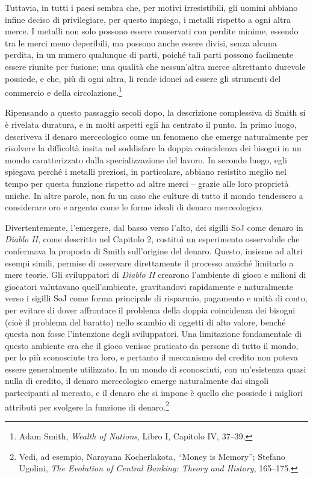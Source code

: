 \documentclass[
  a5paper,
  smalldemyvopaper,10pt,twoside,onecolumn,openright,extrafontsizes,hidelinks]{memoir}
\renewenvironment{quote}%
               {\list{}{\rightmargin=.6cm\leftmargin=.6cm}%
                \itshape \item[]}%
               {\endlist}
\begin{document}
\begin{quote}
Tuttavia, in tutti i paesi sembra che, per motivi irresistibili, gli
uomini abbiano infine deciso di privilegiare, per questo impiego, i
metalli rispetto a ogni altra merce. I metalli non solo possono essere
conservati con perdite minime, essendo tra le merci meno deperibili, ma
possono anche essere divisi, senza alcuna perdita, in un numero
qualunque di parti, poiché tali parti possono facilmente essere riunite
per fusione; una qualità che nessun'altra merce altrettanto durevole
possiede, e che, più di ogni altra, li rende idonei ad essere gli
strumenti del commercio e della circolazione.\footnote{Adam Smith,
  \emph{Wealth of Nations}, Libro I, Capitolo IV, 37--39.}
\end{quote}

Ripensando a questo passaggio secoli dopo, la descrizione complessiva di
Smith si è rivelata duratura, e in molti aspetti egli ha centrato il
punto. In primo luogo, descriveva il denaro merceologico come un
fenomeno che emerge naturalmente per risolvere la difficoltà insita nel
soddisfare la doppia coincidenza dei bisogni in un mondo caratterizzato
dalla specializzazione del lavoro. In secondo luogo, egli spiegava
perché i metalli preziosi, in particolare, abbiano resistito meglio nel
tempo per questa funzione rispetto ad altre merci -- grazie alle loro
proprietà uniche. In altre parole, non fu un caso che culture di tutto
il mondo tendessero a considerare oro e argento come le forme ideali di
denaro merceologico.

Divertentemente, l'emergere, dal basso verso l'alto, dei sigilli SoJ
come denaro in \emph{Diablo II}, come descritto nel Capitolo 2, costituì
un esperimento osservabile che confermava la proposta di Smith
sull'origine del denaro. Questo, insieme ad altri esempi simili, permise
di osservare direttamente il processo anziché limitarlo a mere teorie.
Gli sviluppatori di \emph{Diablo II} crearono l'ambiente di gioco e
milioni di giocatori valutavano quell'ambiente, gravitandovi rapidamente
e naturalmente verso i sigilli SoJ come forma principale di risparmio,
pagamento e unità di conto, per evitare di dover affrontare il problema
della doppia coincidenza dei bisogni (cioè il problema del baratto)
nello scambio di oggetti di alto valore, benché questa non fosse
l'intenzione degli sviluppatori. Una limitazione fondamentale di questo
ambiente era che il gioco venisse praticato da persone di tutto il
mondo, per lo più sconosciute tra loro, e pertanto il meccanismo del
credito non poteva essere generalmente utilizzato. In un mondo di
sconosciuti, con un'esistenza quasi nulla di credito, il denaro
merceologico emerge naturalmente dai singoli partecipanti al mercato, e
il denaro che si impone è quello che possiede i migliori attributi per
svolgere la funzione di denaro.\footnote{Vedi, ad esempio, Narayana
  Kocherlakota, ``Money is Memory''; Stefano Ugolini, \emph{The
  Evolution of Central Banking: Theory and History}, 165--175.}
\end{document}
